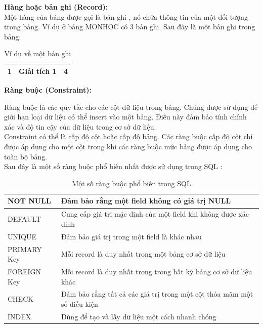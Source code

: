 \textbf{Hàng hoặc bản ghi (Record):}\\
	
Một hàng của bảng được gọi là bản ghi , nó chứa thông tin của một đối tượng trong bảng. Ví dụ ở bảng MONHOC có 3 bản ghi. Sau đây là một bản ghi trong bảng:\\
\begin{table}[H]
    \centering
    \begin{tabular}{|r|r|r|}
        \hline
		1&Giải tích 1&4\\
		\hline
    \end{tabular}
    \caption{Ví dụ về một bản ghi}
\end{table}

\textbf{Ràng buộc (Constraint):}

Ràng buộc là các quy tắc cho các cột dữ liệu trong bảng. Chúng được sử dụng để giới hạn loại dữ liệu có thể insert vào một bảng. Điều này đảm bảo tính chính xác và độ tin cậy của dữ liệu trong cơ sở dữ liệu.\\
Constraint có thể là cấp độ cột hoặc cấp độ bảng. Các ràng buộc cấp độ cột chỉ được áp dụng cho một
cột trong khi các ràng buộc mức bảng được áp dụng cho toàn bộ bảng.\\
Sau đây là một số ràng buộc phổ biến nhất được sử dụng trong SQL :\\
\begin{table}[H]
    \centering
    \begin{tabular}{|l|l|}
        \hline
         NOT NULL&Đảm bảo rằng một field không có giá trị NULL  \\
         \hline
         DEFAULT&Cung cấp giá trị mặc định của một field khi không được xác định\\
         \hline
         UNIQUE&Đảm bảo giá trị trong một field là khác nhau\\
         \hline
         PRIMARY Key&Mỗi record là duy nhất trong một bảng cơ sở dữ liệu\\
         \hline
         FOREIGN Key&Mỗi record là duy nhất trong trong bất kỳ bảng cơ sở dữ liệu khác\\
         \hline
         CHECK&Đảm bảo rằng tất cả các giá trị trong một cột thỏa mãm một số điều kiện\\
         \hline
         INDEX&Dùng để tạo và lấy dữ liệu một cách nhanh chóng\\
         \hline
    \end{tabular}
    \caption{Một số ràng buộc phổ biến trong SQL}
\end{table}
